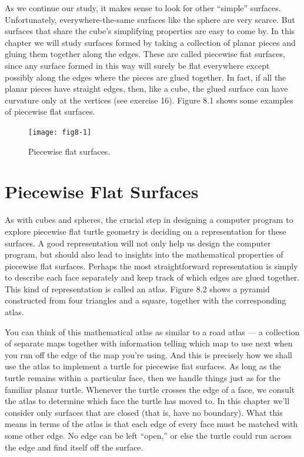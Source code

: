 \documentclass{book}
\begin{document}
As we continue our study, it makes sense to look for other ``simple''
surfaces. Unfortunately, everywhere-the-same surfaces like the sphere
are very scarce. But surfaces that share the cube's simplifying properties
are easy to come by. In this chapter we will study surfaces formed by
taking a collection of planar pieces and gluing them together along the
edges. These are called piecewise fiat surfaces, since any surface formed
in this way will surely be flat everywhere except possibly along the edges
where the pieces are glued together. In fact, if all the planar pieces have
straight edges, then, like a cube, the glued surface can have curvature
only at the vertices (see exercise 16). Figure 8.1 shows some examples
of piecewise flat surfaces.

\begin{figure}
\begin{center}
\texttt{[image: fig8-1]}
\caption{Piecewise flat surfaces.}
\end{center}
\end{figure}

\section{Piecewise Flat Surfaces}

As with cubes and spheres, the crucial step in designing a computer
program to explore piecewise flat turtle geometry is deciding on a representation for these surfaces. A good representation will not only help
us design the computer program, but should also lead to insights into
the mathematical properties of piecewise flat surfaces. Perhaps the most
straightforward representation is simply to describe each face separately
and keep track of which edges are glued together. This kind of representation is called an atlas. Figure 8.2 shows a pyramid constructed
from four triangles and a square, together with the corresponding atlas.

You can think of this mathematical atlas as similar to a road atlas --- a
collection of separate maps together with information telling which map
to use next when you run off the edge of the map you're using. And this
is precisely how we shall use the atlas to implement a turtle for piecewise
fiat surfaces. As long as the turtle remains within a particular face, then
we handle things just as for the familiar planar turtle. Whenever the
turtle crosses the edge of a face, we consult the atlas to determine which
face the turtle has moved to. In this chapter we'll consider only surfaces
that are closed (that is, have no boundary). What this means in terms
of the atlas is that each edge of every face must be matched with some
other edge. No edge can be left ``open,'' or else the turtle could run
across the edge and find itself off the surface.
\end{document}
